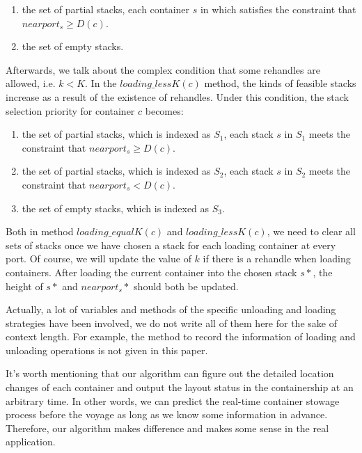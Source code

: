 \documentclass[review,3p,times,authoryear,12pt]{elsarticle}
\begin{document}
\begin{enumerate}
\item the set of partial stacks, each container $s$ in which satisfies the constraint that $nearport_s \ge D(c)$.
\item the set of empty stacks.
\end{enumerate}


Afterwards, we talk about the complex condition that some rehandles are allowed, i.e. $k < K$.
In the $loading\_lessK(c)$ method, the kinds of feasible stacks increase as a result of the existence of rehandles.
Under this condition, the stack selection priority for container $c$ becomes:

\begin{enumerate}
\item the set of partial stacks, which is indexed as $S_1$, each stack $s$ in $S_1$ meets the constraint that $nearport_s \ge D(c)$.
\item the set of partial stacks, which is indexed as $S_2$, each stack $s$ in $S_2$ meets the constraint that $nearport_s < D(c)$.
\item the set of empty stacks, which is indexed as $S_3$.
\end{enumerate}

Both in method $loading\_equalK(c)$ and $loading\_lessK(c)$, we need to clear all sets of stacks once we have chosen a stack for each loading container at every port.
Of course, we will update the value of $k$ if there is a rehandle when loading containers.
After loading the current container into the chosen stack $s*$, the height of $s*$ and $nearport_s*$ should both be updated.

Actually, a lot of variables and methods of the specific unloading and loading strategies have been involved, we do not write all of them here for the sake of context length.
For example, the method to record the information of loading and unloading operations is not given in this paper.

It's worth mentioning that our algorithm can figure out the detailed location changes of each container and output the layout status in the containership at an arbitrary time.
In other words, we can predict the real-time container stowage process before the voyage as long as we know some information in advance.
Therefore, our algorithm makes difference and makes some sense in the real application.
\end{document}
